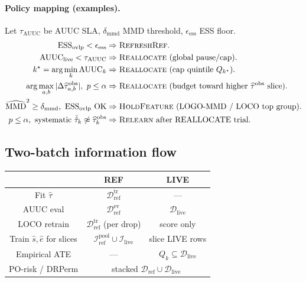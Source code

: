 \paragraph{Policy mapping (examples).}
Let $\tau_{\mathrm{AUUC}}$ be AUUC SLA, $\delta_{\mathrm{mmd}}$ MMD threshold, $\epsilon_{\mathrm{ess}}$ ESS floor.
\begin{align*}
  \mathrm{ESS}_{\mathrm{ovlp}}<\epsilon_{\mathrm{ess}}
  &\Rightarrow \textsc{RefreshRef}.\\
  \mathrm{AUUC}_{\mathrm{live}}<\tau_{\mathrm{AUUC}}
  &\Rightarrow \textsc{Reallocate}\ \text{(global pause/cap)}.\\
  k^\star=\arg\min_k \mathrm{AUUC}_k
  &\Rightarrow \textsc{Reallocate}\ \text{(cap quintile $Q_{k^\star}$)}.\\
  \arg\max_{a,b}|\Delta\widehat{\tau}^{\mathrm{obs}}_{a,b}|,\ p\le\alpha
  &\Rightarrow \textsc{Reallocate}\ \text{(budget toward higher $\widehat{\tau}^{\mathrm{obs}}$ slice)}.\\
  \widehat{\mathrm{MMD}}^2\ge\delta_{\mathrm{mmd}},\ \mathrm{ESS}_{\mathrm{ovlp}}\ \text{OK}
  &\Rightarrow \textsc{HoldFeature}\ \text{(LOGO-MMD / LOCO top group)}.\\
  p\le\alpha,\ \text{systematic } \bar{\hat\tau}_k\not\approx\widehat{\tau}^{\mathrm{obs}}_k
  &\Rightarrow \textsc{Relearn}\ \text{after REALLOCATE trial}.
\end{align*}

\subsection{Two-batch information flow}

\begin{center}
\begin{tabular}{@{}c|c|c@{}}
\toprule
 & REF & LIVE \\
\midrule
Fit $\hat\tau$ & $\mathcal{D}_{\mathrm{ref}}^{\mathrm{tr}}$ & --- \\
AUUC eval & $\mathcal{D}_{\mathrm{ref}}^{\mathrm{ev}}$ & $\mathcal{D}_{\mathrm{live}}$ \\
LOCO retrain & $\mathcal{D}_{\mathrm{ref}}^{\mathrm{tr}}$ (per drop) & score only \\
Train $\hat s,\hat e$ for slices & $\mathcal{I}_{\mathrm{ref}}^{\mathrm{pool}}\cup\mathcal{I}_{\mathrm{live}}$ & slice LIVE rows \\
Empirical ATE & --- & $Q_k\subseteq\mathcal{D}_{\mathrm{live}}$ \\
PO-risk / DRPerm & \multicolumn{2}{c}{stacked $\mathcal{D}_{\mathrm{ref}}\cup\mathcal{D}_{\mathrm{live}}$} \\
\bottomrule
\end{tabular}
\end{center}

